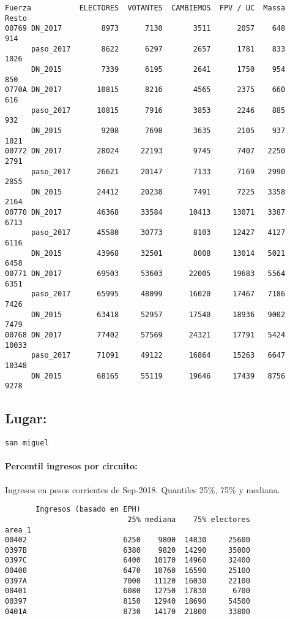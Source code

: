 \documentclass[11pt]{article}
\begin{document}
    \begin{verbatim}
Fuerza           ELECTORES  VOTANTES  CAMBIEMOS  FPV / UC  Massa  Resto
00769 DN_2017         8973      7130       3511      2057    648    914
      paso_2017       8622      6297       2657      1781    833   1026
      DN_2015         7339      6195       2641      1750    954    850
0770A DN_2017        10815      8216       4565      2375    660    616
      paso_2017      10815      7916       3853      2246    885    932
      DN_2015         9208      7698       3635      2105    937   1021
00772 DN_2017        28024     22193       9745      7407   2250   2791
      paso_2017      26621     20147       7133      7169   2990   2855
      DN_2015        24412     20238       7491      7225   3358   2164
00770 DN_2017        46368     33584      10413     13071   3387   6713
      paso_2017      45580     30773       8103     12427   4127   6116
      DN_2015        43968     32501       8008     13014   5021   6458
00771 DN_2017        69503     53603      22005     19683   5564   6351
      paso_2017      65995     48099      16020     17467   7186   7426
      DN_2015        63418     52957      17540     18936   9002   7479
00768 DN_2017        77402     57569      24321     17791   5424  10033
      paso_2017      71091     49122      16864     15263   6647  10348
      DN_2015        68165     55119      19646     17439   8756   9278
    \end{verbatim}

    
    \hypertarget{lugar}{%
\subsection{Lugar:}\label{lugar}}

    
    \begin{Verbatim}[commandchars=\\\{\}]
san miguel

    \end{Verbatim}

    \hypertarget{percentil-ingresos-por-circuito}{%
\paragraph{Percentil ingresos por
circuito:}\label{percentil-ingresos-por-circuito}}

    
    Ingresos en pesos corrientes de Sep-2018. Quantiles 25\%, 75\% y
mediana.

    
    
    \begin{verbatim}
       Ingresos (basado en EPH)                         
                            25% mediana    75% electores
area_1                                                  
00402                      6250    9800  14830     25600
0397B                      6380    9820  14290     35000
0397C                      6400   10170  14960     32400
00400                      6470   10760  16590     25100
0397A                      7000   11120  16030     22100
00401                      6080   12750  17830      6700
00397                      8150   12940  18690     54500
0401A                      8730   14170  21800     33800
    \end{verbatim}
\end{document}
